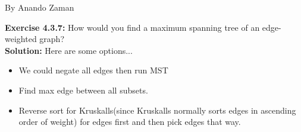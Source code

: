 \documentclass[11pt,fleqn]{article}
\begin{document}
By Anando Zaman

\textbf{Exercise 4.3.7:} How would you find a maximum spanning tree of an edge-weighted graph?\\

\textbf{Solution:} Here are some options...
\begin{itemize}
	\item We could negate all edges then run MST
	\item Find max edge between all subsets.
	\item Reverse sort for Kruskalls(since Kruskalls normally sorts edges in ascending order of weight) for edges first and then pick edges that way.


\end{itemize}



	
\end{document}
